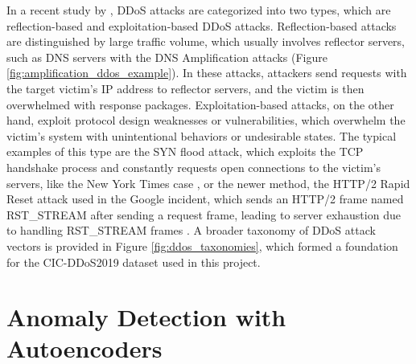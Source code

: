 In a recent study by \cite{8888419}, DDoS attacks are categorized into two types, which are reflection-based and exploitation-based DDoS attacks. Reflection-based attacks are distinguished by large traffic volume, which usually involves reflector servers, such as DNS servers with the DNS Amplification attacks (Figure \ref{fig:amplification_ddos_example}). In these attacks, attackers send requests with the target victim's IP address to reflector servers, and the victim is then overwhelmed with response packages. Exploitation-based attacks, on the other hand, exploit protocol design weaknesses or vulnerabilities, which overwhelm the victim's system with unintentional behaviors or undesirable states. The typical examples of this type are the SYN flood attack, which exploits the TCP handshake process and constantly requests open connections to the victim's servers, like the New York Times case \citep{nyt-ddos}, or the newer method, the HTTP/2 Rapid Reset attack used in the Google incident, which sends an HTTP/2 frame named RST\_STREAM after sending a request frame, leading to server exhaustion due to handling RST\_STREAM frames \citep{google-http2-rapid-reset}. A broader taxonomy of DDoS attack vectors is provided in Figure \ref{fig:ddos_taxonomies}, which formed a foundation for the CIC-DDoS2019 dataset used in this project.

\section{Anomaly Detection with Autoencoders}

